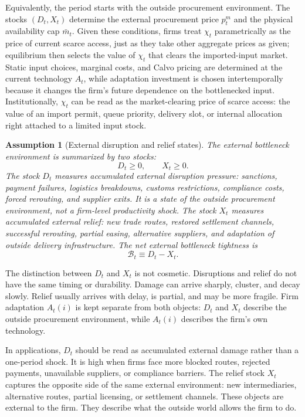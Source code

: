 ﻿\documentclass[12pt]{article}
\newtheorem{assumption}{Assumption}
\theoremstyle{remark}
\begin{document}
Equivalently, the period starts with the outside procurement environment. The stocks $(D_t,X_t)$
determine the external procurement price $p_t^m$ and the physical availability cap $\bar m_t$.
Given these conditions, firms treat $\chi_t$ parametrically as the price of current scarce access,
just as they take other aggregate prices as given; equilibrium then selects the value of $\chi_t$
that clears the imported-input market. Static input choices, marginal costs, and Calvo pricing are
determined at the current technology $A_t$, while adaptation investment is chosen
intertemporally because it changes the firm's future dependence on the bottlenecked input.
Institutionally, $\chi_t$ can be read as the market-clearing price of scarce access: the value of
an import permit, queue priority, delivery slot, or internal allocation right attached to a limited
input stock.

\begin{assumption}[External disruption and relief states]\label{ass:DX}
The external bottleneck environment is summarized by two stocks:
\begin{equation}
    D_t\ge 0,
    \qquad
    X_t\ge 0.
    \label{eq:DX_states}
\end{equation}
The stock $D_t$ measures accumulated external disruption pressure: sanctions, payment failures,
logistics breakdowns, customs restrictions, compliance costs, forced rerouting, and supplier exits.
It is a state of the outside procurement environment, not a firm-level productivity shock. The
stock $X_t$ measures accumulated external relief: new trade routes, restored settlement channels,
successful rerouting, partial easing, alternative suppliers, and adaptation of outside delivery
infrastructure. The net external bottleneck tightness is
\begin{equation}
    \mathcal B_t\equiv D_t-X_t.
    \label{eq:B_definition}
\end{equation}
\end{assumption}

The distinction between $D_t$ and $X_t$ is not cosmetic. Disruptions and relief do not have the
same timing or durability. Damage can arrive sharply, cluster, and decay slowly. Relief usually
arrives with delay, is partial, and may be more fragile. Firm adaptation $A_t(i)$ is kept separate
from both objects: $D_t$ and $X_t$ describe the outside procurement environment, while $A_t(i)$
describes the firm's own technology.

In applications, $D_t$ should be read as accumulated external damage rather than a one-period
shock. It is high when firms face more blocked routes, rejected payments, unavailable suppliers, or
compliance barriers. The relief stock $X_t$ captures the opposite side of the same external
environment: new intermediaries, alternative routes, partial licensing, or settlement channels.
These objects are external to the firm. They describe what the outside world allows the firm to do.
\end{document}
